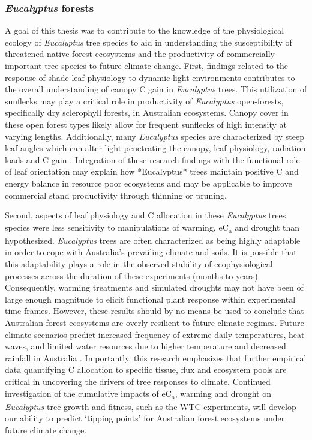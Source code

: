 \documentclass[a4paper]{article}\usepackage[]{graphicx}\usepackage[]{color}
\begin{document}
\subsubsection*{\textit{Eucalyptus} forests}
A goal of this thesis was to contribute to the knowledge of the physiological ecology of \textit{Eucalyptus} tree species to aid in understanding the susceptibility of threatened native forest ecosystems and the productivity of commercially important tree species to future climate change. First, findings related to the response of shade leaf physiology to dynamic light environments contributes to the overall understanding of canopy C gain in \textit{Eucalyptus} trees. This utilization of sunflecks may play a critical role in productivity of \textit{Eucalyptus} open-forests, specifically dry sclerophyll forests, in Australian ecosystems. Canopy cover in these open forest types likely allow for frequent sunflecks of high intensity at varying lengths. Additionally, many \textit{Eucalyptus} species are characterized by steep leaf angles which can alter light penetrating the canopy, leaf physiology, radiation loads and C gain \citep{cowan1981coping, king1997functional, james2000leaf, falster2003leaf}. Integration of these research findings with the functional role of leaf orientation may explain how *Eucalyptus* trees maintain positive C and energy balance in resource poor ecosystems and may be applicable to improve commercial stand productivity through thinning or pruning.

Second, aspects of leaf physiology and C allocation in these \textit{Eucalyptus} trees species were less sensitivity to manipulations of warming, eC\textsubscript{a} and drought than hypothesized. \textit{Eucalyptus} trees are often characterized as being highly adaptable in order to cope with Australia’s prevailing climate and soils. It is possible that this adaptability plays a role in the observed stability of ecophysiological processes across the duration of these experiments (months to years). Consequently, warming treatments and simulated droughts may not have been of large enough magnitude to elicit functional plant response within experimental time frames. However, these results should by no means be used to conclude that Australian forest ecosystems are overly resilient to future climate regimes. Future climate scenarios predict increased frequency of extreme daily temperatures, heat waves, and limited water resources due to higher temperature and decreased rainfall in Australia \citep{ipcc2014}. Importantly, this research emphasizes that further empirical data quantifying C allocation to specific tissue, flux and ecosystem pools are critical in uncovering the drivers of tree responses to climate. Continued investigation of the cumulative impacts of eC\textsubscript{a}, warming and drought on \textit{Eucalyptus} tree growth and fitness, such as the WTC experiments, will develop our ability to predict ‘tipping points’ for Australian forest ecosystems under future climate change.
\end{document}
